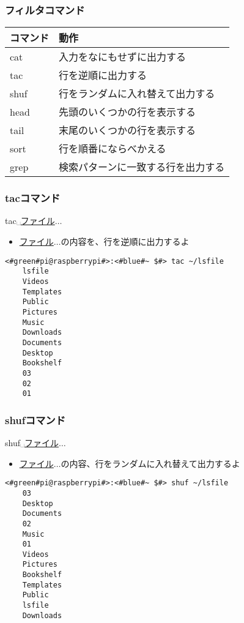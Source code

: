 \begin{frame}
    \frametitle{フィルタコマンド}
    \begin{tabular}{ll}
        コマンド & 動作                               \\ \hline
        cat      & 入力をなにもせずに出力する         \\
        tac      & 行を逆順に出力する                 \\
        shuf     & 行をランダムに入れ替えて出力する   \\
        head     & 先頭のいくつかの行を表示する       \\
        tail     & 末尾のいくつかの行を表示する       \\
        sort     & 行を順番にならべかえる             \\
        grep     & 検索パターンに一致する行を出力する \\ \hline
    \end{tabular}
\end{frame}

\begin{frame}[fragile]
    \frametitle{tacコマンド}
    tac␣\underline{ファイル}$\ldots$
    \begin{itemize}
        \item \underline{ファイル}$\ldots$の内容を、行を逆順に出力するよ
    \end{itemize}
    \begin{lstlisting}[title=tacコマンドの実行例, label=tac_example]
    <#green#pi@raspberrypi#>:<#blue#~ $#> tac ~/lsfile
    lsfile
    Videos
    Templates
    Public
    Pictures
    Music
    Downloads
    Documents
    Desktop
    Bookshelf
    03
    02
    01 
    \end{lstlisting}
\end{frame}

\begin{frame}[fragile]
    \frametitle{shufコマンド}
    shuf␣\underline{ファイル}$\ldots$
    \begin{itemize}
        \item \underline{ファイル}$\ldots$の内容、行をランダムに入れ替えて出力するよ
    \end{itemize}
    \begin{lstlisting}[title=shufコマンドの実行例, label=shuf_example]
    <#green#pi@raspberrypi#>:<#blue#~ $#> shuf ~/lsfile
    03
    Desktop
    Documents
    02
    Music
    01
    Videos
    Pictures
    Bookshelf
    Templates
    Public
    lsfile
    Downloads
    \end{lstlisting}
\end{frame}

